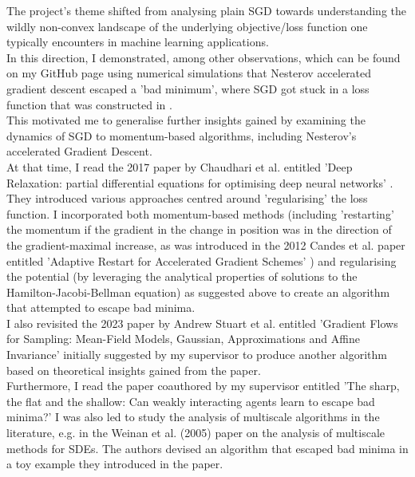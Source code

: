 \documentclass{article}
\theoremstyle{mystyle}
\begin{document}
The project's theme shifted from analysing plain SGD towards understanding the wildly non-convex landscape of the underlying objective/loss function one typically encounters in machine learning applications.\\

In this direction, I demonstrated, among other observations, which can be found on my GitHub page \cite{Tassopoulos_Imperial_Summer_Research_2023} using numerical simulations that Nesterov accelerated gradient descent escaped a 'bad minimum', where SGD got stuck in a loss function that was constructed in \cite{Mei_2018}. \\

This motivated me to generalise further insights gained by examining the dynamics of SGD to momentum-based algorithms, including Nesterov's accelerated Gradient Descent. \\

At that time, I read the 2017 paper by Chaudhari et al. entitled 'Deep Relaxation: partial differential equations for optimising deep neural networks' \cite{Chaudhari2017DeepRP}. They introduced various approaches centred around 'regularising' the loss function. I incorporated both momentum-based methods (including 'restarting' the momentum if the gradient in the change in position was in the direction of the gradient-maximal increase, as was introduced in the 2012 Candes et al. paper entitled 'Adaptive Restart for Accelerated Gradient Schemes' \cite{odonoghue2012adaptiverestartacceleratedgradient}) and regularising the potential (by leveraging the analytical properties of solutions to the Hamilton-Jacobi-Bellman equation) as suggested above to create an algorithm that attempted to escape bad minima.\\

I also revisited the 2023 paper by Andrew Stuart et al. entitled 'Gradient Flows for Sampling: Mean-Field Models, Gaussian, Approximations and Affine Invariance'\cite{chen2023gradientflowssamplingmeanfield} initially suggested by my supervisor to produce another algorithm based on theoretical insights gained from the paper. \\

Furthermore, I read the paper coauthored by my supervisor entitled 'The sharp, the flat and the shallow: Can weakly interacting agents learn to escape bad minima?' \cite{kantas2019sharpflatshallowweakly} I was also led to study the analysis of multiscale algorithms in the literature, e.g. in the Weinan et al. (2005) paper \cite{weinan2005multiscalesde} on the analysis of multiscale methods for SDEs. The authors devised an algorithm that escaped bad minima in a toy example they introduced in the paper. \\
\end{document}
